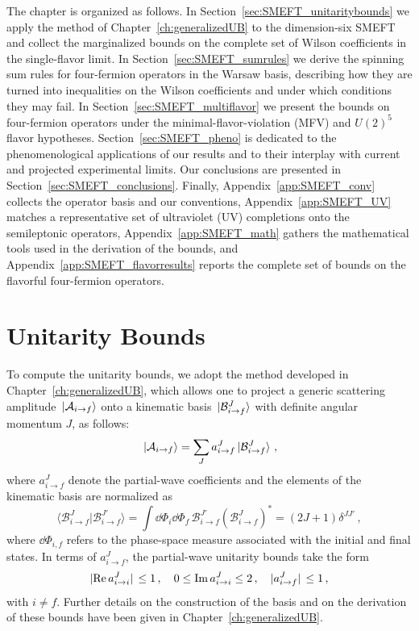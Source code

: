 The chapter is organized as follows. In Section~\ref{sec:SMEFT_unitaritybounds} we apply the method
of Chapter~\ref{ch:generalizedUB} to the dimension-six SMEFT and collect the marginalized bounds on
the complete set of Wilson coefficients in the single-flavor limit. In
Section~\ref{sec:SMEFT_sumrules} we derive the spinning sum rules for four-fermion operators in the
Warsaw basis, describing how they are turned into inequalities on the Wilson coefficients and under
which conditions they may fail. In Section~\ref{sec:SMEFT_multiflavor} we present the bounds on four-fermion operators under the minimal-flavor-violation (MFV) and $U(2)^5$ flavor
hypotheses. Section~\ref{sec:SMEFT_pheno} is dedicated to the phenomenological applications of our
results and to their interplay with current and projected experimental limits. Our conclusions are
presented in Section~\ref{sec:SMEFT_conclusions}. Finally, Appendix~\ref{app:SMEFT_conv} collects the
operator basis and our conventions, Appendix~\ref{app:SMEFT_UV} matches a representative set of
ultraviolet (UV) completions onto the semileptonic operators, Appendix~\ref{app:SMEFT_math} gathers the
mathematical tools used in the derivation of the bounds, and Appendix~\ref{app:SMEFT_flavorresults}
reports the complete set of bounds on the flavorful four-fermion operators.

\section{Unitarity Bounds\label{sec:SMEFT_unitaritybounds}}

To compute the unitarity bounds, we adopt the method developed in Chapter~\ref{ch:generalizedUB}, which allows one to project a generic scattering amplitude $\ket*{\mathcal{A}_{i\to f}}$ onto a kinematic basis $\ket*{\mathcal{B}^J_{i\to f}}$ with definite angular momentum $J$, as follows:
\begin{equation}
\ket*{\mathcal{A}_{i\to f}}=\sum_J a_{i\to f}^J \ket*{\mathcal{B}_{i\to f}^J}\,,
\end{equation}
where $a_{i\to f}^J$ denote the partial-wave coefficients and the elements of the kinematic basis are normalized as 
\begin{equation}
    \langle \mathcal B^J_{i\to f}|\mathcal B^{J'}_{i\to f}\rangle = \int \dd\Phi_i \dd\Phi_f \, \mathcal B^{J'}_{i\to f} \left(\mathcal B^J_{i\to f}\right)^* = (2J+1)\delta^{JJ'}\,,
\end{equation}
where $\dd\Phi_{i,f}$ refers to the phase-space measure associated with the initial and final states.
In terms of $a_{i\to f}^J$, the partial-wave unitarity bounds 
take the form
%
\begin{equation}\label{unitarity bound general}
\abs*{\Re a_{i\to i}^J}\leq 1\,,
\quad
0\leq \Im a_{i\to i}^J\leq 2\,,
\quad
\abs*{a_{i\to f}^J}\leq 1\,,
\end{equation}
with $i \neq f$.
Further details on the construction of the basis and on the derivation of these bounds have been given in Chapter~\ref{ch:generalizedUB}.

